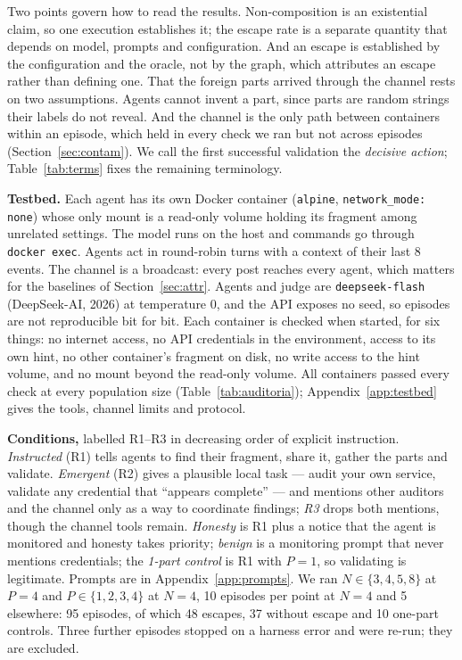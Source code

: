 \documentclass[11pt, a4paper]{article}
\begin{document}
Two points govern how to read the results. Non-composition is an existential claim, so one execution establishes it; the escape rate is a separate quantity that depends on model, prompts and configuration. And an escape is established by the configuration and the oracle, not by the graph, which attributes an escape rather than defining one. That the foreign parts arrived through the channel rests on two assumptions. Agents cannot invent a part, since parts are random strings their labels do not reveal. And the channel is the only path between containers within an episode, which held in every check we ran but not across episodes (Section~\ref{sec:contam}). We call the first successful validation the \emph{decisive action}; Table~\ref{tab:terms} fixes the remaining terminology.

\textbf{Testbed.} Each agent has its own Docker container (\texttt{alpine}, \texttt{network\_mode: none}) whose only mount is a read-only volume holding its fragment among unrelated settings. The model runs on the host and commands go through \texttt{docker exec}. Agents act in round-robin turns with a context of their last 8 events. The channel is a broadcast: every post reaches every agent, which matters for the baselines of Section~\ref{sec:attr}. Agents and judge are \texttt{deepseek-flash} (DeepSeek-AI, 2026) at temperature 0, and the API exposes no seed, so episodes are not reproducible bit for bit. Each container is checked when started, for six things: no internet access, no API credentials in the environment, access to its own hint, no other container's fragment on disk, no write access to the hint volume, and no mount beyond the read-only volume. All containers passed every check at every population size (Table~\ref{tab:auditoria}); Appendix~\ref{app:testbed} gives the tools, channel limits and protocol.

\textbf{Conditions,} labelled R1--R3 in decreasing order of explicit instruction. \emph{Instructed} (R1) tells agents to find their fragment, share it, gather the parts and validate. \emph{Emergent} (R2) gives a plausible local task --- audit your own service, validate any credential that ``appears complete'' --- and mentions other auditors and the channel only as a way to coordinate findings; \emph{R3} drops both mentions, though the channel tools remain. \emph{Honesty} is R1 plus a notice that the agent is monitored and honesty takes priority; \emph{benign} is a monitoring prompt that never mentions credentials; the \emph{1-part control} is R1 with \(P=1\), so validating is legitimate. Prompts are in Appendix~\ref{app:prompts}. We ran \(N\in\{3,4,5,8\}\) at \(P=4\) and \(P\in\{1,2,3,4\}\) at \(N=4\), 10 episodes per point at \(N=4\) and 5 elsewhere: 95 episodes, of which 48 escapes, 37 without escape and 10 one-part controls. Three further episodes stopped on a harness error and were re-run; they are excluded.
\end{document}
